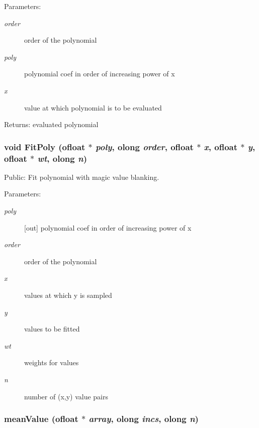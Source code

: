 \begin{Desc}
\item[Parameters:]
\begin{description}
\item[{\em order}]order of the polynomial \item[{\em poly}]polynomial coef in order of increasing power of x \item[{\em x}]value at which polynomial is to be evaluated \end{description}
\end{Desc}
\begin{Desc}
\item[Returns:]evaluated polynomial \end{Desc}
\subsubsection{\setlength{\rightskip}{0pt plus 5cm}void Fit\-Poly ({\bf ofloat} $\ast$ {\em poly}, {\bf olong} {\em order}, {\bf ofloat} $\ast$ {\em x}, {\bf ofloat} $\ast$ {\em y}, {\bf ofloat} $\ast$ {\em wt}, {\bf olong} {\em n})}\label{ObitUtil_8h_a6}


Public: Fit polynomial with magic value blanking. 

\begin{Desc}
\item[Parameters:]
\begin{description}
\item[{\em poly}][out] polynomial coef in order of increasing power of x \item[{\em order}]order of the polynomial \item[{\em x}]values at which y is sampled \item[{\em y}]values to be fitted \item[{\em wt}]weights for values \item[{\em n}]number of (x,y) value pairs \end{description}
\end{Desc}
\subsubsection{ mean\-Value ({\bf ofloat} $\ast$ {\em array}, {\bf olong} {\em incs}, {\bf olong} {\em n})}\label{ObitUtil_8h_a0}


